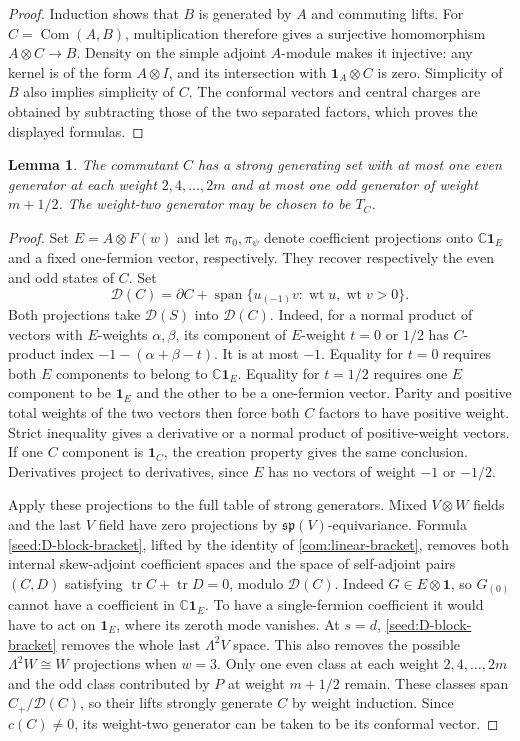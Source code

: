\documentclass[11pt,a4paper]{amsart}
\numberwithin{equation}{section}
\newtheorem{lemma}[theorem]{Lemma}
\theoremstyle{definition}
\theoremstyle{remark}
\newcommand{\C}{\mathbb C}
\begin{document}
\begin{proof}
Induction shows that $B$ is generated by $A$ and commuting lifts.
For $C=\operatorname{Com}(A,B)$, multiplication therefore gives a
surjective homomorphism $A\otimes C\to B$. Density on the simple
adjoint $A$-module makes it injective: any kernel is of the form
$A\otimes I$, and its intersection with $\mathbf1_A\otimes C$ is zero.
Simplicity of $B$ also implies simplicity of $C$. The conformal vectors and central charges are obtained by subtracting
those of the two separated factors, which proves the displayed formulas.
\end{proof}

\begin{lemma}\label{seed:D-commutant-generators}
The commutant $C$ has a strong generating set with at most one even
generator at each weight $2,4,\ldots,2m$ and at most one odd generator
of weight $m+1/2$. The weight-two generator may be chosen to be $T_C$.
\end{lemma}
\begin{proof}
Set
$E=A\otimes F(w)$ and let $\pi_0,\pi_\psi$ denote coefficient
projections onto $\C\mathbf1_E$ and a fixed one-fermion vector, respectively.
They recover respectively the even and odd states of $C$. Set
$$
 \mathcal D(C)=\partial C+
 \operatorname{span}\{u_{(-1)}v:\operatorname{wt}u,
 \operatorname{wt}v>0\}.
$$
Both projections take $\mathcal D(S)$ into $\mathcal D(C)$.
Indeed, for a normal product of vectors with $E$-weights
$\alpha,\beta$, its component of $E$-weight $t=0$ or $1/2$ has
$C$-product index $-1-(\alpha+\beta-t)$.
It is at most $-1$. Equality for $t=0$ requires both $E$ components to belong to $\C\mathbf1_E$.
Equality for $t=1/2$ requires one $E$ component to be $\mathbf1_E$ and the other to be a one-fermion vector. Parity and
positive total weights of the two vectors then force both $C$ factors to have
positive weight. Strict inequality gives a derivative or a normal product of
positive-weight vectors. If one $C$ component is $\mathbf1_C$,
the creation property gives the same conclusion. Derivatives project
to derivatives, since $E$ has no vectors of weight $-1$ or $-1/2$.

Apply these projections to the full table of strong generators. Mixed
$V\otimes W$ fields and the last $V$ field have zero projections
by $\mathfrak{sp}(V)$-equivariance. Formula \eqref{seed:D-block-bracket}, lifted by the
identity of \cref{com:linear-bracket}, removes both internal skew-adjoint coefficient
spaces and the space of self-adjoint pairs $(C,D)$ satisfying
$\operatorname{tr}C+\operatorname{tr}D=0$, modulo $\mathcal D(C)$. Indeed $G\in E\otimes\mathbf1$, so
$G_{(0)}$ cannot have a coefficient in $\C\mathbf1_E$. To have a
single-fermion coefficient it would have to act on $\mathbf1_E$,
where its zeroth mode vanishes. At $s=d$, \eqref{seed:D-block-bracket} removes the whole
last $\Lambda^2V$ space. This also removes the possible
$\Lambda^2W\cong W$ projections when $w=3$.
Only one even class at each weight $2,4,\ldots,2m$ and the odd
class contributed by $P$ at weight $m+1/2$ remain. These classes
span $C_+/\mathcal D(C)$, so their lifts strongly generate $C$ by
weight induction. Since $c(C)\ne0$, its weight-two generator can be
taken to be its conformal vector.
\end{proof}
\end{document}
